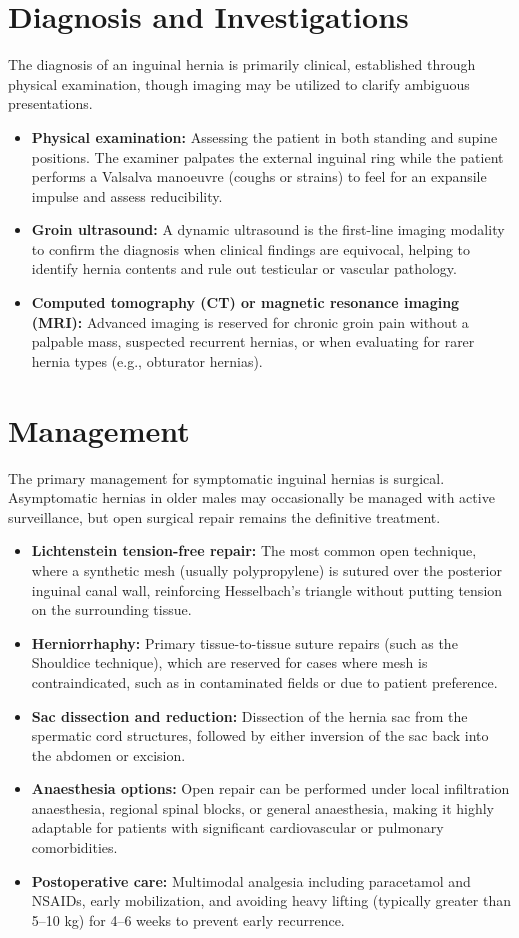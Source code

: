 \section*{Diagnosis and Investigations}
The diagnosis of an inguinal hernia is primarily clinical, established through physical examination, though imaging may be utilized to clarify ambiguous presentations.
\begin{itemize}
    \item \textbf{Physical examination:} Assessing the patient in both standing and supine positions. The examiner palpates the external inguinal ring while the patient performs a Valsalva manoeuvre (coughs or strains) to feel for an expansile impulse and assess reducibility.
    \item \textbf{Groin ultrasound:} A dynamic ultrasound is the first-line imaging modality to confirm the diagnosis when clinical findings are equivocal, helping to identify hernia contents and rule out testicular or vascular pathology.
    \item \textbf{Computed tomography (CT) or magnetic resonance imaging (MRI):} Advanced imaging is reserved for chronic groin pain without a palpable mass, suspected recurrent hernias, or when evaluating for rarer hernia types (e.g., obturator hernias).
\end{itemize}

\section*{Management}
The primary management for symptomatic inguinal hernias is surgical. Asymptomatic hernias in older males may occasionally be managed with active surveillance, but open surgical repair remains the definitive treatment.
\begin{itemize}
    \item \textbf{Lichtenstein tension-free repair:} The most common open technique, where a synthetic mesh (usually polypropylene) is sutured over the posterior inguinal canal wall, reinforcing Hesselbach's triangle without putting tension on the surrounding tissue.
    \item \textbf{Herniorrhaphy:} Primary tissue-to-tissue suture repairs (such as the Shouldice technique), which are reserved for cases where mesh is contraindicated, such as in contaminated fields or due to patient preference.
    \item \textbf{Sac dissection and reduction:} Dissection of the hernia sac from the spermatic cord structures, followed by either inversion of the sac back into the abdomen or excision.
    \item \textbf{Anaesthesia options:} Open repair can be performed under local infiltration anaesthesia, regional spinal blocks, or general anaesthesia, making it highly adaptable for patients with significant cardiovascular or pulmonary comorbidities.
    \item \textbf{Postoperative care:} Multimodal analgesia including paracetamol and NSAIDs, early mobilization, and avoiding heavy lifting (typically greater than 5--10 kg) for 4--6 weeks to prevent early recurrence.
\end{itemize}

